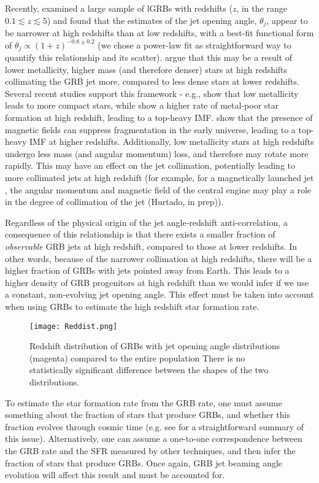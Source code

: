 \documentclass[fleqn,usenatbib,useAMS]{mnras}
\begin{document}
  Recently, \cite{LR19,LR20} examined a large sample of lGRBs with redshifts ($z$, in the range $0.1 \lesssim z \lesssim 5$) and found that the estimates of the jet opening angle, $\theta_{j}$, appear to be narrower at high redshifts than at low redshifts, with a best-fit functional form of $\theta_{j} \propto (1+z)^{-0.8 \pm 0.2}$ (we chose a power-law fit as straightforward way to quantify this relationship and its scatter).  \cite {LR20} argue that this may be a result of lower metallicity, higher mass (and therefore denser) stars at high redshifts collimating the GRB jet more, compared to less dense stars at lower redshifts. Several recent studies support this framework - e.g., \cite{Klen20} show that low metallicity leads to more compact stars, while \cite{Chrus2020} show a higher rate of metal-poor star formation at high redshift, leading to a top-heavy IMF. \cite{Shard2020} show that the presence of magnetic fields can suppress fragmentation in the early universe, leading to a top-heavy IMF at higher redshifts.  Additionally, low metallicity stars at high redshifts undergo less mass (and angular momentum) loss, and therefore may rotate more rapidly. This may have an effect on the jet collimation, potentially leading to more collimated jets at high redshift (for example, for a magnetically launched jet \citep{BZ77}, the angular momentum and magnetic field of the central engine may play a role in the degree of collimation of the jet (Hurtado, in prep)).  
  
  Regardless of the physical origin of the jet angle-redshift anti-correlation, a consequence of this relationship is that there exists a smaller fraction of {\em observable} GRB jets at high redshift, compared to those at lower redshifts.  In other words, because of the narrower collimation at high redshifts, there will be a higher fraction of GRBs with jets pointed away from Earth.  This leads to a higher density of GRB progenitors at high redshift than we would infer if we use a constant, non-evolving jet opening angle. This effect must be taken into account when using GRBs to estimate the high redshift star formation rate.
  
  \begin{figure}
    \centering
    \texttt{[image: Reddist.png]}
    \caption{Redshift distribution of GRBs with jet opening angle distributions (magenta) compared to the entire population  There is no statistically significant difference between the shapes of the two distributions.}
    \label{fig:Reddist}
\end{figure}
  To estimate the star formation rate from the GRB rate, one must assume something about the fraction of stars that produce GRBs, and whether this fraction evolves through cosmic time (e.g. see \cite{Kist08,Yuk08,Kist09} for a straightforward summary of this issue).   Alternatively, one can assume a one-to-one correspondence between the GRB rate and the SFR measured by other techniques, and then infer the fraction of stars that produce GRBs.  Once again, GRB jet beaming angle evolution will affect this result and must be accounted for.
  
\end{document}
